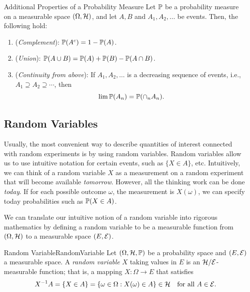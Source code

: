 \begin{thm}{Additional Properties of a Probability Measure}{}
	Let \(\mathbb{P}\) be a probability measure on a measurable space \((\Omega, \mathcal{H})\), and let \(A, B\) and \(A_1, A_2, \dots\) be events. Then, the following hold:
	\begin{enumerate}
		\item (\textit{Complement}): \(\mathbb{P}(A^c) = 1 - \mathbb{P}(A)\).
		\item (\textit{Union}): \(\mathbb{P}(A \cup B) = \mathbb{P}(A) + \mathbb{P}(B) - \mathbb{P}(A \cap B)\).
		\item (\textit{Continuity from above}): If \(A_1, A_2, \dots\) is a decreasing sequence of events, i.e., \(A_1 \supseteq A_2 \supseteq \cdots\), then
		      \begin{equation}
			      \lim \mathbb{P}(A_n) = \mathbb{P}(\cap_n A_n).
			      \label{eq:ContinuityFromAbove}
		      \end{equation}
	\end{enumerate}
\end{thm}

\subsection{Random Variables}
Usually, the most convenient way to describe quantities of interest connected with random experiments is by using random variables. Random variables allow us to use intuitive notation for certain events, such as \(\{X \in A\}\), etc. Intuitively, we can think of a random variable \(X\) as a measurement on a random experiment that will become available \textit{tomorrow}. However, all the thinking work can be done \textit{today}. If for each possible outcome \(\omega\), the measurement is \(X(\omega)\), we can specify today probabilities such as \(\mathbb{P}(X \in A)\).

We can translate our intuitive notion of a random variable into rigorous mathematics by defining a random variable to be a measurable function from \((\Omega, \mathcal{H})\) to a measurable space \((E, \mathcal{E})\).

\begin{defn}{Random Variable}{RandomVariable}
	Let \((\Omega, \mathcal{H}, \mathbb{P})\) be a probability space and \((E, \mathcal{E})\) a measurable space. A \textit{random variable} \(X\) taking values in \(E\) is an \(\mathcal{H}/\mathcal{E}\)-measurable function; that is, a mapping \(X : \Omega \to E\) that satisfies
	\begin{equation}
		X^{-1}A = \{X \in A\} = \{\omega \in \Omega : X(\omega) \in A\} \in \mathcal{H} \quad \text{for all } A \in \mathcal{E}.
		\label{eq:RandomVariableDef}
	\end{equation}
\end{defn}

